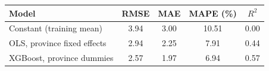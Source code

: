 \begin{tabular}{@{}lcccc@{}}
\toprule
Model & RMSE & MAE & MAPE (\%) & $R^2$ \\
\midrule
Constant (training mean) & 3.94 & 3.00 & 10.51 & 0.00 \\
OLS, province fixed effects & 2.94 & 2.25 & 7.91 & 0.44 \\
XGBoost, province dummies & 2.57 & 1.97 & 6.94 & 0.57 \\
\bottomrule
\end{tabular}

